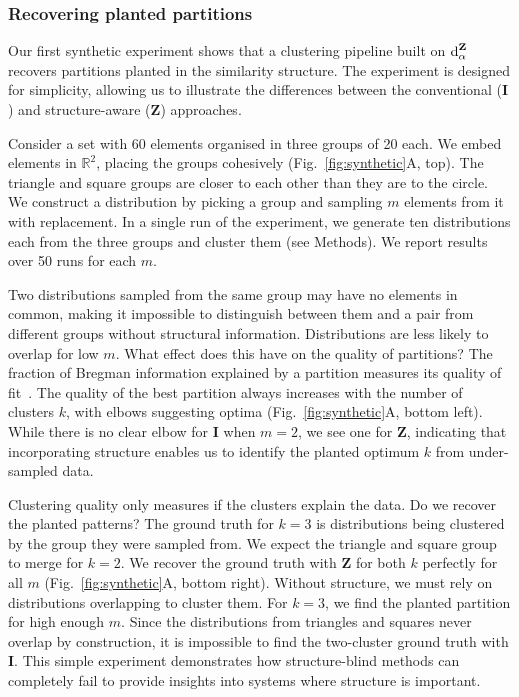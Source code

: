 \documentclass[aps,pre,floats,floatfix,superscriptaddress,twocolumn,final,10pt]{revtex4-2}
\theoremstyle{definition}
\renewcommand{\vec}[1]{\mathbf{#1}}
\newcommand{\divergencename}[2]{\textnormal{d}^{#1}_{#2}}
\begin{document}
\subsubsection{Recovering planted partitions}
Our first synthetic experiment shows that a clustering pipeline built on $\divergencename{\vec{Z}}{\alpha}$ recovers partitions planted in the similarity structure. The experiment is designed for simplicity, allowing us to illustrate the differences between the conventional ($\vec{I}$) and structure-aware ($\vec{Z}$) approaches.

Consider a set with 60 elements organised in three groups of 20 each. We embed elements in $\mathbb{R}^2$, placing the groups cohesively (Fig.~\ref{fig:synthetic}A, top). The triangle and square groups are closer to each other than they are to the circle. We construct a distribution by picking a group and sampling $m$ elements from it with replacement. In a single run of the experiment, we generate ten distributions each from the three groups and cluster them (see Methods). We report results over 50 runs for each $m$.

Two distributions sampled from the same group may have no elements in common, making it impossible to distinguish between them and a pair from different groups without structural information. Distributions are less likely to overlap for low $m$. What effect does this have on the quality of partitions? The fraction of Bregman information explained by a partition measures its quality of fit~\cite{Banerjee2004}. The quality of the best partition always increases with the number of clusters $k$, with elbows suggesting optima (Fig.~\ref{fig:synthetic}A, bottom left). While there is no clear elbow for $\vec{I}$ when $m=2$, we see one for $\vec{Z}$, indicating that incorporating structure enables us to identify the planted optimum $k$ from under-sampled data.

Clustering quality only measures if the clusters explain the data. Do we recover the planted patterns? The ground truth for $k=3$ is distributions being clustered by the group they were sampled from. We expect the triangle and square group to merge for $k=2$. We recover the ground truth with $\vec{Z}$ for both $k$ perfectly for all $m$ (Fig.~\ref{fig:synthetic}A, bottom right). Without structure, we must rely on distributions overlapping to cluster them. For $k=3$, we find the planted partition for high enough $m$. Since the distributions from triangles and squares never overlap by construction, it is impossible to find the two-cluster ground truth with $\vec{I}$. This simple experiment demonstrates how structure-blind methods can completely fail to provide insights into systems where structure is important.
\end{document}
